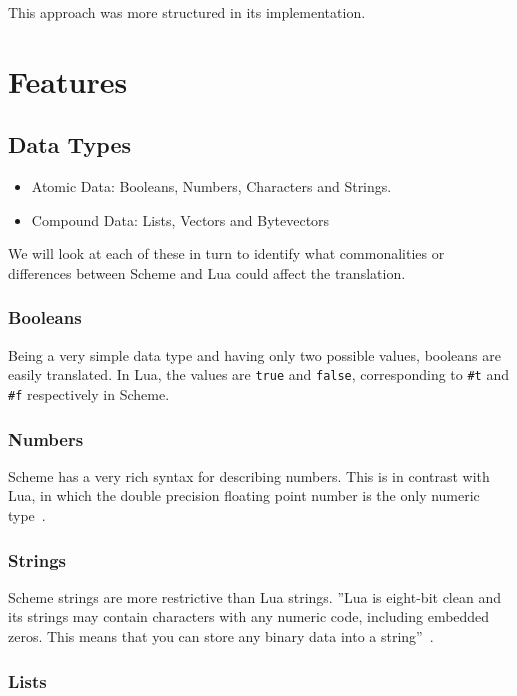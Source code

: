 This approach was more structured in its implementation.


\section{Features}

\subsection{Data Types}

\begin{itemize}
\item Atomic Data: Booleans, Numbers, Characters and Strings.
\item Compound Data: Lists, Vectors and Bytevectors
\end{itemize}

We will look at each of these in turn to identify what commonalities or
differences between Scheme and Lua could affect the translation.

\subsubsection{Booleans}

Being a very simple data type and having only two possible values, booleans are
easily translated. In Lua, the values are \texttt{true} and \texttt{false},
corresponding to \texttt{\#t} and \texttt{\#f} respectively in Scheme.

\subsubsection{Numbers}

Scheme has a very rich syntax for describing numbers. This is in contrast with
Lua, in which the double precision floating point number is the only
numeric type~\cite[p.10]{luabook}.

\subsubsection{Strings}

Scheme strings are more restrictive than Lua strings. ''Lua is
eight-bit clean and its strings may contain characters with any numeric code,
including embedded zeros. This means that you can store any binary data into a
string''~\cite[p.11]{luabook}.

\subsubsection{Lists}


